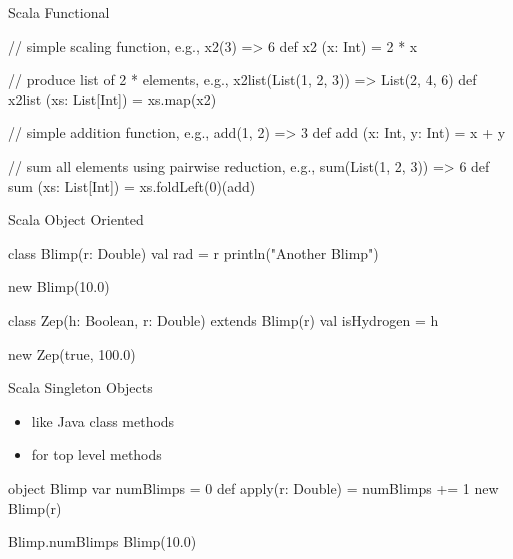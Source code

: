 \begin{frame}[fragile]{Scala Functional}
\begin{scala}
// simple scaling function, e.g., x2(3) => 6
def x2 (x: Int) = 2 * x
\end{scala}

\begin{scala}
// produce list of 2 * elements, e.g., x2list(List(1, 2, 3)) => List(2, 4, 6)
def x2list (xs: List[Int]) = xs.map(x2)
\end{scala}

\begin{scala}
// simple addition function, e.g., add(1, 2) => 3
def add (x: Int, y: Int) = x + y
\end{scala}

\begin{scala}
// sum all elements using pairwise reduction, e.g., sum(List(1, 2, 3)) => 6
def sum (xs: List[Int]) = xs.foldLeft(0)(add)
\end{scala}
\end{frame}

\begin{frame}[fragile]{Scala Object Oriented}

\begin{scala}
class Blimp(r: Double) {
  val rad = r
  println("Another Blimp")
}

new Blimp(10.0)
\end{scala}

\begin{scala}
class Zep(h: Boolean, r: Double) extends Blimp(r) {
  val isHydrogen = h
}

new Zep(true, 100.0)
\end{scala}

\end{frame}

\begin{frame}[fragile]{Scala Singleton Objects}

\begin{itemize}
\item like Java class methods
\item for top level methods
\end{itemize}
\begin{scala}
object Blimp {
  var numBlimps = 0
  def apply(r: Double) = {
    numBlimps += 1
    new Blimp(r)
  }
}

Blimp.numBlimps
Blimp(10.0)
\end{scala}

\end{frame}

